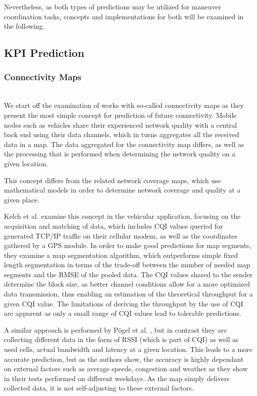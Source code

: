 \documentclass[conference]{IEEEtran}
\begin{document}
Nevertheless, as both types of predictions may be utilized for maneuver coordination tasks, concepts and implementations for both will be examined in the following.

\subsection{KPI Prediction}\label{kpi}
\subsubsection{Connectivity Maps}\mbox{}\\
We start off the examination of works with so-called connectivity maps as they present the most simple concept for prediction of future connectivity. Mobile nodes such as vehicles share their experienced network quality with a central back end using their data channels, which in turns aggregates all the received data in a map. The data aggregated for the connectivity map differs, as well as the processing that is performed when determining the network quality on a given location.

This concept differs from the related network coverage maps, which use mathematical models in order to determine network coverage and quality at a given place.

Kelch et al. \cite{kelchCQIMapsOptimized2013} examine this concept in the vehicular application, focusing on the acquisition and matching of data, which includes CQI values queried for generated TCP/IP traffic on their cellular modem, as well as the coordinates gathered by a GPS module. In order to make good predictions for map segments, they examine a map segmentation algorithm, which outperforms simple fixed length segmentation in terms of the trade-off between the number of needed map segments and the RMSE of the pooled data. The CQI values shared to the sender determine the block size, as better channel conditions allow for a more optimized data transmission, thus enabling an estimation of the theoretical throughput for a given CQI value. The limitations of deriving the throughput by the use of CQI are apparent as only a small range of CQI values lead to tolerable predictions.

A similar approach is performed by Pögel et al. \cite{pogelPrediction3GNetwork2012}, but in contrast they are collecting different data in the form of RSSI (which is part of CQI) as well as used cells, actual bandwidth and latency at a given location. This leads to a more accurate prediction, but as the authors show, the accuracy is highly dependant on external factors such as average speeds, congestion and weather as they show in their tests performed on different weekdays. As the map simply delivers collected data, it is not self-adjusting to these external factors.
\end{document}
